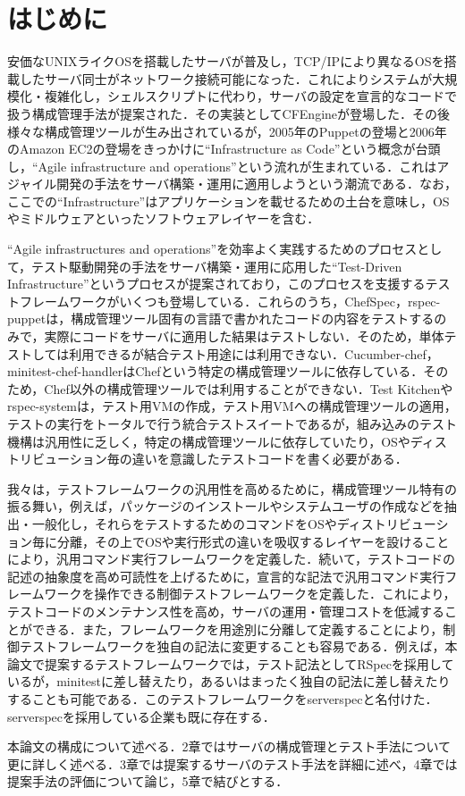 \section{はじめに}

安価なUNIXライクOSを搭載したサーバが普及し，TCP/IPにより異なるOSを搭載したサーバ同士がネットワーク接続可能になった．これによりシステムが大規模化・複雑化し，シェルスクリプトに代わり，サーバの設定を宣言的なコードで扱う構成管理手法が提案された．その実装としてCFEngine\cite{cfengine}が登場した．その後様々な構成管理ツールが生み出されているが\cite{cmt}，2005年のPuppetの登場\cite{puppet}と2006年のAmazon EC2の登場\cite{ec2}をきっかけに``Infrastructure as Code''という概念が台頭し，``Agile infrastructure and operations''\cite{agile infrastructure}という流れが生まれている．これはアジャイル開発の手法をサーバ構築・運用に適用しようという潮流である．なお，ここでの``Infrastructure''はアプリケーションを載せるための土台を意味し，OSやミドルウェアといったソフトウェアレイヤーを含む．

``Agile infrastructures and operations''を効率よく実践するためのプロセスとして，テスト駆動開発の手法をサーバ構築・運用に応用した``Test-Driven Infrastructure''\cite{test driven infrastructure with chef}というプロセスが提案されており，このプロセスを支援するテストフレームワークがいくつも登場している\cite{chefspec}\cite{rspec-puppet}\cite{cucumber-chef}\cite{minitest-chef-handler}\cite{test kitchen}\cite{rspec-system}．これらのうち，ChefSpec\cite{chefspec}，rspec-puppet\cite{rspec-puppet}は，構成管理ツール固有の言語で書かれたコードの内容をテストするのみで，実際にコードをサーバに適用した結果はテストしない．そのため，単体テストしては利用できるが結合テスト用途には利用できない．Cucumber-chef\cite{cucumber-chef}，minitest-chef-handler\cite{minitest-chef-handler}はChefという特定の構成管理ツールに依存している．そのため，Chef以外の構成管理ツールでは利用することができない．Test Kitchen\cite{test kitchen}やrspec-system\cite{rspec-system}は，テスト用VMの作成，テスト用VMへの構成管理ツールの適用，テストの実行をトータルで行う統合テストスイートであるが，組み込みのテスト機構は汎用性に乏しく，特定の構成管理ツールに依存していたり，OSやディストリビューション毎の違いを意識したテストコードを書く必要がある．

我々は，テストフレームワークの汎用性を高めるために，構成管理ツール特有の振る舞い，例えば，パッケージのインストールやシステムユーザの作成などを抽出・一般化し，それらをテストするためのコマンドをOSやディストリビューション毎に分離，その上でOSや実行形式の違いを吸収するレイヤーを設けることにより，汎用コマンド実行フレームワークを定義した．続いて，テストコードの記述の抽象度を高め可読性を上げるために，宣言的な記法で汎用コマンド実行フレームワークを操作できる制御テストフレームワークを定義した．これにより，テストコードのメンテナンス性を高め，サーバの運用・管理コストを低減することができる．また，フレームワークを用途別に分離して定義することにより，制御テストフレームワークを独自の記法に変更することも容易である．例えば，本論文で提案するテストフレームワークでは，テスト記法としてRSpec\cite{rspec}を採用しているが，minitest\cite{minitest}に差し替えたり，あるいはまったく独自の記法に差し替えたりすることも可能である．このテストフレームワークをserverspec\cite{serverspec}と名付けた．serverspecを採用している企業も既に存在する\cite{nintendo}．

本論文の構成について述べる．2章ではサーバの構成管理とテスト手法について更に詳しく述べる．3章では提案するサーバのテスト手法を詳細に述べ，4章では提案手法の評価について論じ，5章で結びとする．
